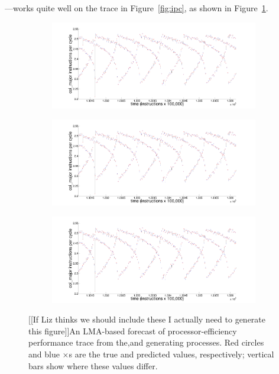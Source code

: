 ---works quite well on the trace in Figure~\ref{fig:ipc}, as
shown in Figure~\ref{fig:lmacol}. 
%
\begin{figure}
   \centering
\begin{subfigure}{\columnwidth}
    \includegraphics[width=\columnwidth]{figs/colPredShortTS}
    \caption{\col }
    \label{fig:lmacol}
  \end{subfigure}%
  
    \begin{subfigure}{\columnwidth}
    \includegraphics[width=\columnwidth]{figs/colPredShortTS}
    \caption{\gcc}
    \label{fig:lmagcc}
  \end{subfigure} 
  \begin{subfigure}{\columnwidth}
    \includegraphics[width=\columnwidth]{figs/colPredShortTS}
    \caption{\svdfive}
    \label{fig:lmasvdfive}
  \end{subfigure}%
  \caption{{\color{red} [[If Liz thinks we should include these I actually need to generate this figure]]}An LMA-based forecast of
       processor-efficiency performance trace from the\col ,\gcc and \svdfive generating processes.  Red circles and blue $\times$s are the true and
       predicted values, respectively; vertical bars show where these
       values differ.}\label{fig:lmapredictions}
 \end{figure}
